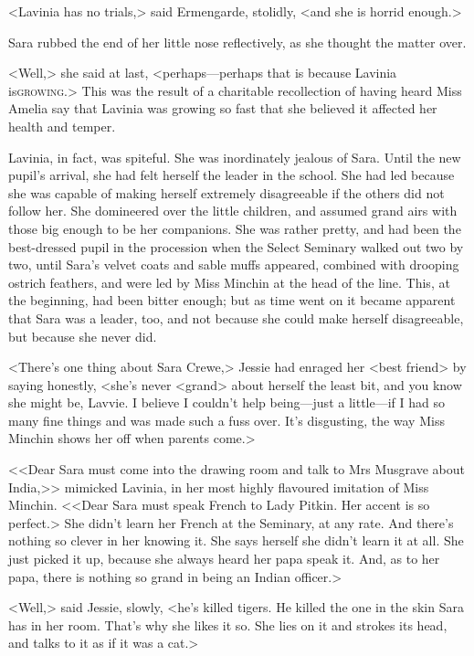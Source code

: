 <Lavinia has no trials,> said Ermengarde, stolidly, <and she is horrid enough.>

Sara rubbed the end of her little nose reflectively, as she thought the matter over.

<Well,> she said at last, <perhaps—perhaps that is because Lavinia is\textsc{growing}.> This was the result of a charitable recollection of having heard Miss Amelia say that Lavinia was growing so fast that she believed it affected her health and temper.

Lavinia, in fact, was spiteful. She was inordinately jealous of Sara. Until the new pupil's arrival, she had felt herself the leader in the school. She had led because she was capable of making herself extremely disagreeable if the others did not follow her. She domineered over the little children, and assumed grand airs with those big enough to be her companions. She was rather pretty, and had been the best-dressed pupil in the procession when the Select Seminary walked out two by two, until Sara's velvet coats and sable muffs appeared, combined with drooping ostrich feathers, and were led by Miss Minchin at the head of the line. This, at the beginning, had been bitter enough; but as time went on it became apparent that Sara was a leader, too, and not because she could make herself disagreeable, but because she never did.

<There's one thing about Sara Crewe,> Jessie had enraged her <best friend> by saying honestly, <she's never <grand> about herself the least bit, and you know she might be, Lavvie. I believe I couldn't help being—just a little—if I had so many fine things and was made such a fuss over. It's disgusting, the way Miss Minchin shows her off when parents come.>

<<Dear Sara must come into the drawing room and talk to Mrs Musgrave about India,>> mimicked Lavinia, in her most highly flavoured imitation of Miss Minchin. <<Dear Sara must speak French to Lady Pitkin. Her accent is so perfect.> She didn't learn her French at the Seminary, at any rate. And there's nothing so clever in her knowing it. She says herself she didn't learn it at all. She just picked it up, because she always heard her papa speak it. And, as to her papa, there is nothing so grand in being an Indian officer.>

<Well,> said Jessie, slowly, <he's killed tigers. He killed the one in the skin Sara has in her room. That's why she likes it so. She lies on it and strokes its head, and talks to it as if it was a cat.>

